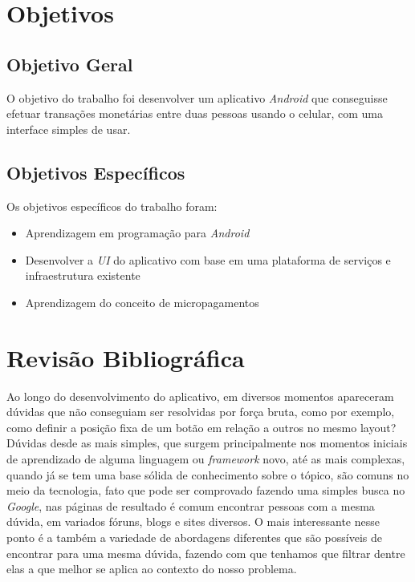\documentclass[hidelinks,12pt]{article}
\begin{document}
\section{Objetivos}


\subsection{Objetivo Geral}
O objetivo do trabalho foi desenvolver um aplicativo \textit{Android} que conseguisse efetuar transa\c{c}\~oes monet\'arias entre duas pessoas usando o celular, com uma interface simples de usar.
\newline


\subsection{Objetivos Espec\'ificos}
Os objetivos espec\'ificos do trabalho foram:
\begin{itemize}
	\item Aprendizagem em programa\c{c}\~ao para \textit{Android}
	\item Desenvolver a \textit{UI} do aplicativo com base em uma plataforma de servi\c{c}os e infraestrutura existente
	\item Aprendizagem do conceito de micropagamentos
\end{itemize}
\newpage
\section{Revis\~ao Bibliogr\'afica}
Ao longo do desenvolvimento do aplicativo, em diversos momentos apareceram d\'uvidas que n\~ao conseguiam ser resolvidas por for\c{c}a bruta, como por exemplo, como definir a posi\c{c}\~ao fixa de um bot\~ao em rela\c{c}\~ao a outros no mesmo layout? D\'uvidas desde as mais simples, que surgem principalmente nos momentos iniciais de aprendizado de alguma linguagem ou \textit{framework} novo, at\'e as mais complexas, quando j\'a se tem uma base s\'olida de conhecimento sobre o t\'opico, s\~ao comuns no meio da tecnologia, fato que pode ser comprovado fazendo uma simples busca no \textit{Google}, nas p\'aginas de resultado \'e comum encontrar pessoas com a mesma d\'uvida, em variados f\'oruns, blogs e  sites diversos. O mais interessante nesse ponto \'e a tamb\'em a variedade de abordagens diferentes que s\~ao poss\'iveis de encontrar para uma mesma d\'uvida, fazendo com que tenhamos que filtrar dentre elas a que melhor se aplica ao contexto do nosso problema.
\end{document}
